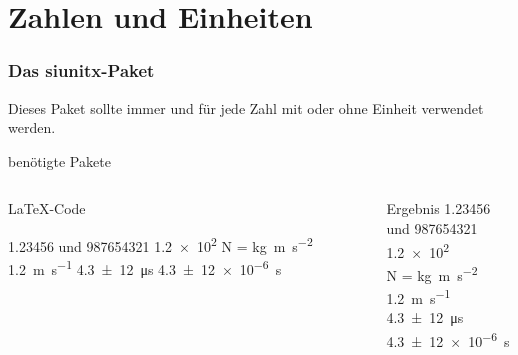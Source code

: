 \section{Zahlen und Einheiten}
\begin{frame}[fragile]
    \frametitle{Das siunitx-Paket \hfill{}}
    Dieses Paket sollte immer und für jede Zahl mit oder ohne Einheit verwendet werden.

   \begin{block}{benötigte Pakete}
    \begin{lstverbatim}
        \usepackage[locale=DE, separate-uncertainty=true, per-mode=fraction]
                   {siunitx}
    \end{lstverbatim}
   \end{block}
    \begin{columns}[T]
        \begin{column}{0.6\textwidth}
            \begin{block}{\LaTeX-Code}
                \begin{lstverbatim}
                \num{1.23456} und \num{987654321}
                \num{1.2e2}
                \si{\newton} = \si{\kilo\gram\metre\per\second\squared}
                \SI{1.2}{\metre\per\second}
                \SI{4,3(12)}{\micro\second}
                \SI{4,3(12)e-6}{\second}
                \end{lstverbatim}
            \end{block}
        \end{column}
        \begin{column}{0.35\textwidth}
            \begin{block}{Ergebnis}
                \num{1.23456} und \num{987654321} \\
                \num{1.2e2} \\
                \smallbreak
                \si{\newton} = \si{\kilo\gram\metre\per\second\squared} \\
                \medbreak
                \SI{1.2}{\metre\per\second} \\
                \SI{4,3(12)}{\micro\second}
                \SI{4,3(12)e-6}{\second}
            \end{block}
        \end{column}
    \end{columns}
\end{frame}

